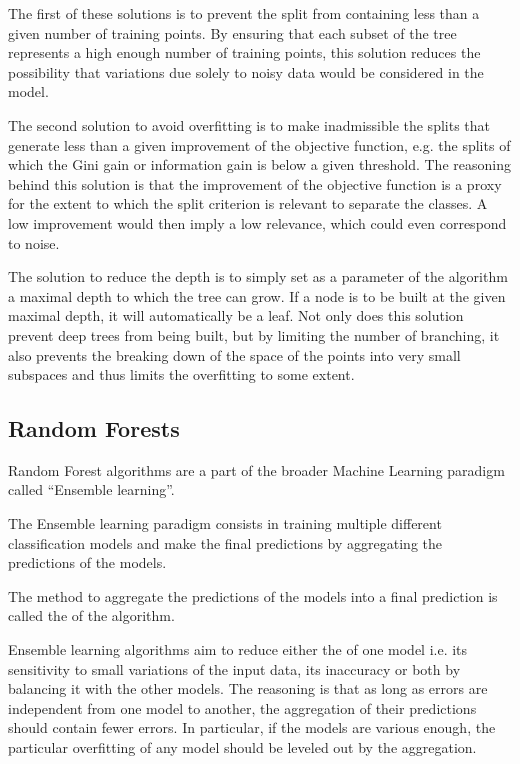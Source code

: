 The first of these solutions is to prevent the split from containing less than a given number of training points. By ensuring that each subset of the tree represents a high enough number of training points, this solution reduces the possibility that variations due solely to noisy data would be considered in the model.

The second solution to avoid overfitting is to make inadmissible the splits that generate less than a given improvement of the objective function, e.g. the splits of which the Gini gain or information gain is below a given threshold. The reasoning behind this solution is that the improvement of the objective function is a proxy for the extent to which the split criterion is relevant to separate the classes. A low improvement would then imply a low relevance, which could even correspond to noise.

The solution to reduce the depth is to simply set as a parameter of the algorithm a maximal depth to which the tree can grow. If a node is to be built at the given maximal depth, it will automatically be a leaf. Not only does this solution prevent deep trees from being built, but by limiting the number of branching, it also prevents the breaking down of the space of the points into very small subspaces and thus limits the overfitting to some extent.

\subsection{Random Forests}
Random Forest algorithms are a part of the broader Machine Learning paradigm called “Ensemble learning”.
\begin{definition}
The Ensemble learning paradigm consists in training multiple different classification models and make the final predictions by aggregating the predictions of the models.
\end{definition}

The method to aggregate the predictions of the models into a final prediction is called the  of the algorithm.

Ensemble learning algorithms aim to reduce either the  of one model i.e. its sensitivity to small variations of the input data, its inaccuracy or both by balancing it with the other models. The reasoning is that as long as errors are independent from one model to another, the aggregation of their predictions should contain fewer errors. In particular, if the models are various enough, the particular overfitting of any model should be leveled out by the aggregation.

